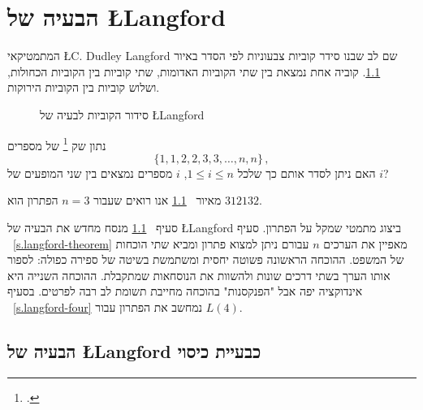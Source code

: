 
\chapter{הבעיה של 
\L{\Large Langford}}
\label{c.langford}

המתמטיקאי
\L{C. Dudley Langford}
שם לב שבנו סידר קוביות צבעוניות לפי הסדר באיור%
~\ref{f.langford}.
קוביה אחת נמצאת בין שתי הקוביות האדומות, שתי קוביות בין הקוביות הכחולות, ושלוש קוביות בין הקוביות הירוקות.  
\begin{figure}[h]
\begin{center}
\end{center}
\caption{סידור הקוביות לבעיה של \L{Langford}}\label{f.langford}
\end{figure}

\begin{definition}
נתון שק%
\footnote{.} 
של מספרים
\[
\{1,1,2,2,3,3,\ldots,n,n\}\,,
\]
האם ניתן לסדר אותם כך שלכל
$1\leq i \leq n$, $i$
מספרים נמצאים בין שני המופעים של
$i$?
\end{definition}
מאיור%
~\ref{f.langford}
אנו רואים שעבור 
$n=3$
הפתרון הוא
$312132$.

סעיף%
~\ref{s.langford-covering} 
מנסח מחדש את הבעיה של
\L{Langford}
ביצוג מתמטי שמקל על הפתרון. סעיף%
~\ref{s.langford-theorem}
מאפיין את הערכים 
$n$
עבורם ניתן למצוא פתרון ומביא שתי הוכחות של המשפט. ההוכחה הראשונה פשוטה יחסית ומשתמשת בשיטה של ספירה כפולה: לספור אותו הערך בשתי דרכים שונות ולהשוות את הנוסחאות שמתקבלת. ההוכחה השנייה היא אינדוקציה יפה אבל "הפנקסנות" בהוכחה מחייבת תשומת לב רבה לפרטים. בסעיף%
~\ref{s.langford-four}
נמחשב את הפתרון עבור
$L(4)$.


\section{
הבעיה של
\L{Langford}
כבעיית כיסוי}
\label{s.langford-covering}

